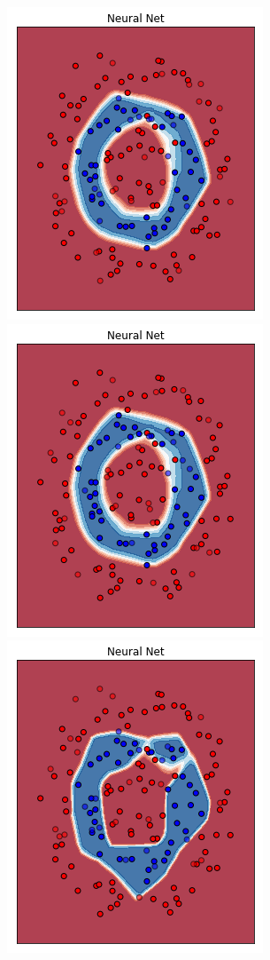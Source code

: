 \documentclass[12pt,a4paper]{report}
\begin{document}
\begin{figure}[H]
 \includegraphics[scale = 0.3]{images/circle+-rnd-log./7}
 \includegraphics[scale = 0.3]{images/circle+-rnd-log./8}
 \\
 \includegraphics[scale = 0.35]{images/circle+-rnd-log./9}

\end{figure}
\end{document}
